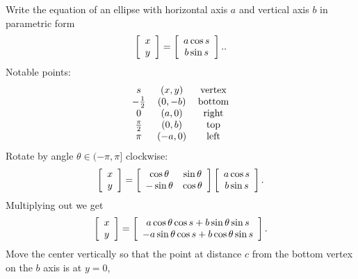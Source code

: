 \documentclass{article}%
\begin{document}
Write the equation of an ellipse with horizontal axis $a$ and vertical axis
$b$ in parametric form%
\[
\left[
\begin{array}
[c]{c}%
x\\
y
\end{array}
\right]  =\left[
\begin{array}
[c]{c}%
a\cos s\\
b\sin s
\end{array}
\right]  ..
\]
Notable points:%
\[%
\begin{tabular}
[c]{ccc}%
$s$ & $\left(  x,y\right)  $ & vertex\\
$-\frac{1}{2}$ & $\left(  0,-b\right)  $ & bottom\\
$0$ & $\left(  a,0\right)  $ & right\\
$\frac{\pi}{2}$ & $\left(  0,b\right)  $ & top\\
$\pi$ & $\left(  -a,0\right)  $ & left
\end{tabular}
\]
Rotate by angle $\theta\in(-\pi,\pi]$ clockwise:%
\[
\left[
\begin{array}
[c]{c}%
x\\
y
\end{array}
\right]  =\left[
\begin{array}
[c]{cc}%
\cos\theta & \sin\theta\\
-\sin\theta & \cos\theta
\end{array}
\right]  \left[
\begin{array}
[c]{c}%
a\cos s\\
b\sin s
\end{array}
\right]  .
\]
Multiplying out we get%
\[
\left[
\begin{array}
[c]{c}%
x\\
y
\end{array}
\right]  =\left[
\begin{array}
[c]{c}%
a\cos\theta\cos s+b\sin\theta\sin s\\
-a\sin\theta\cos s+b\cos\theta\sin s
\end{array}
\right]  .
\]
Move the center vertically so that the point at distance $c$ from the bottom
vertex on the $b$ axis is at $y=0$,%
\end{document}
